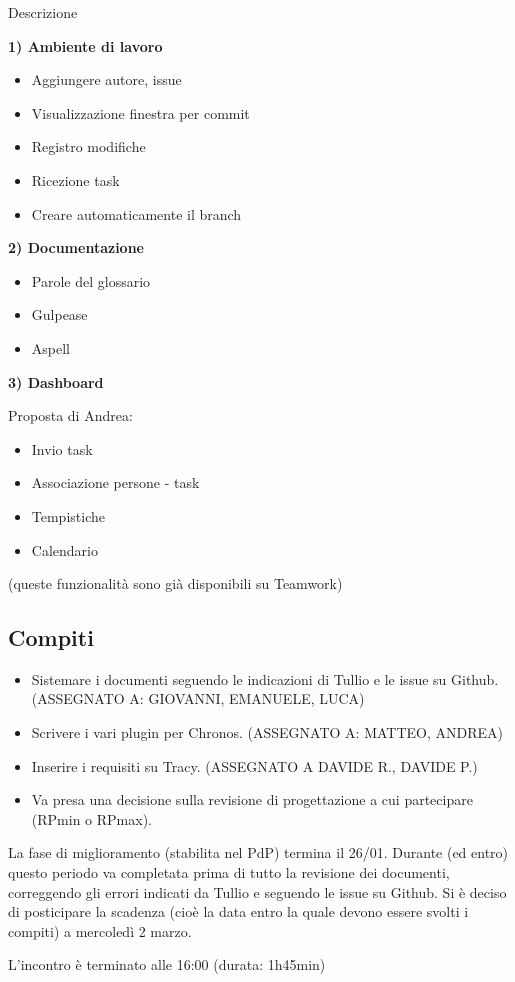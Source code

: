 \documentclass[11pt]{meetingmins}
\begin{document}
Descrizione

\textbf{1) Ambiente di lavoro}

\begin{itemize}
\item Aggiungere autore, issue
\item Visualizzazione finestra per commit
\item Registro modifiche
\item Ricezione task
\item Creare automaticamente il branch
\end{itemize}

\textbf{2) Documentazione}

\begin{itemize}
\item Parole del glossario
\item Gulpease
\item Aspell
\end{itemize}

\textbf{3) Dashboard}

Proposta di Andrea:

\begin{itemize}
\item Invio task
\item Associazione persone - task
\item Tempistiche
\item Calendario
\end{itemize}

(queste funzionalità sono già disponibili su Teamwork)

\subsection{Compiti}

\begin{itemize}
\item Sistemare i documenti seguendo le indicazioni di Tullio e le issue su Github. (ASSEGNATO A: GIOVANNI, EMANUELE, LUCA)
\item Scrivere i vari plugin per Chronos. (ASSEGNATO A: MATTEO, ANDREA)
\item Inserire i requisiti su Tracy. (ASSEGNATO A DAVIDE R., DAVIDE P.)
\item Va presa una decisione sulla revisione di progettazione a cui partecipare (RPmin o RPmax).
\end{itemize}

La fase di miglioramento (stabilita nel PdP) termina il 26/01. Durante (ed entro) questo periodo va completata prima di tutto la revisione dei documenti, correggendo gli errori indicati da Tullio e seguendo le issue su Github.
Si è deciso di posticipare la scadenza (cioè la data entro la quale devono essere svolti i compiti) a mercoledì 2 marzo.

L'incontro è terminato alle 16:00 (durata: 1h45min)

\end{document}
